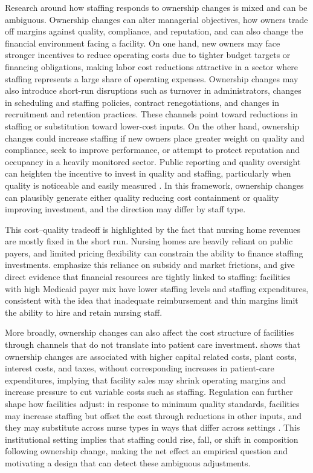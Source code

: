 \documentclass[preprint,authoryear]{elsarticle}
\begin{document}
Research around how staffing responds to ownership changes is mixed and can be ambiguous. Ownership changes can alter managerial objectives, how owners trade off margins against quality, compliance, and reputation, and can also change the financial environment facing a facility. On one hand, new owners may face stronger incentives to reduce operating costs due to tighter budget targets or financing obligations, making labor cost reductions attractive in a sector where staffing represents a large share of operating expenses. Ownership changes may also introduce short-run disruptions such as turnover in administrators, changes in scheduling and staffing policies, contract renegotiations, and changes in recruitment and retention practices. These channels point toward reductions in staffing or substitution toward lower-cost inputs. On the other hand, ownership changes could increase staffing if new owners place greater weight on quality and compliance, seek to improve performance, or attempt to protect reputation and occupancy in a heavily monitored sector. Public reporting and quality oversight can heighten the incentive to invest in quality and staffing, particularly when quality is noticeable and easily measured \citep{park_werner_2011}. In this framework, ownership changes can plausibly generate either quality reducing cost containment or quality improving investment, and the direction may differ by staff type.

This cost–quality tradeoff is highlighted by the fact that nursing home revenues are mostly fixed in the short run. Nursing homes are heavily reliant on public payers, and limited pricing flexibility can constrain the ability to finance staffing investments. \cite{gupta_et_al_2021} emphasize this reliance on subsidy and market frictions, and \cite{bowblis_brunt_2025} give direct evidence that financial resources are tightly linked to staffing: facilities with high Medicaid payer mix have lower staffing levels and staffing expenditures, consistent with the idea that inadequate reimbursement and thin margins limit the ability to hire and retain nursing staff. 

More broadly, ownership changes can also affect the cost structure of facilities through channels that do not translate into patient care investment. \cite{holmes_1996} shows that ownership changes are associated with higher capital related costs, plant costs, interest costs, and taxes, without corresponding increases in patient-care expenditures, implying that facility sales may shrink operating margins and increase pressure to cut variable costs such as staffing. Regulation can further shape how facilities adjust: in response to minimum quality standards, facilities may increase staffing but offset the cost through reductions in other inputs, and they may substitute across nurse types in ways that differ across settings \citep{bowblis_ghattas_2017}. This institutional setting implies that staffing could rise, fall, or shift in composition following ownership change, making the net effect an empirical question and motivating a design that can detect these ambiguous adjustments.
\end{document}
